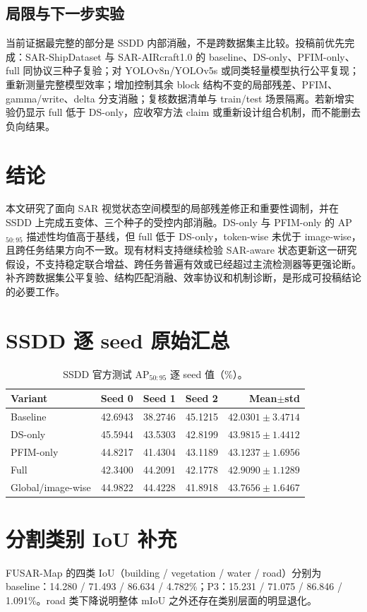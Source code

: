 \documentclass[UTF8,12pt,a4paper]{ctexart}
\begin{document}
\subsection{局限与下一步实验}
当前证据最完整的部分是 SSDD 内部消融，不是跨数据集主比较。投稿前优先完成：SAR-ShipDataset 与 SAR-AIRcraft1.0 的 baseline、DS-only、PFIM-only、full 同协议三种子复验；对 YOLOv8n/YOLOv5s 或同类轻量模型执行公平复现；重新测量完整模型效率；增加控制其余 block 结构不变的局部残差、PFIM、gamma/write、delta 分支消融；复核数据清单与 train/test 场景隔离。若新增实验仍显示 full 低于 DS-only，应收窄方法 claim 或重新设计组合机制，而不能删去负向结果。

\section{结论}
本文研究了面向 SAR 视觉状态空间模型的局部残差修正和重要性调制，并在 SSDD 上完成五变体、三个种子的受控内部消融。DS-only 与 PFIM-only 的 AP$_{50:95}$ 描述性均值高于基线，但 full 低于 DS-only，token-wise 未优于 image-wise，且跨任务结果方向不一致。现有材料支持继续检验 SAR-aware 状态更新这一研究假设，不支持稳定联合增益、跨任务普遍有效或已经超过主流检测器等更强论断。补齐跨数据集公平复验、结构匹配消融、效率协议和机制诊断，是形成可投稿结论的必要工作。

\appendix
\section{SSDD 逐 seed 原始汇总}
\begin{table}[H]\centering\small
\caption{SSDD 官方测试 AP$_{50:95}$ 逐 seed 值（\%）。}
\begin{tabular}{lrrrr}
\toprule
Variant & Seed 0 & Seed 1 & Seed 2 & Mean$\pm$std\\
\midrule
Baseline & 42.6943 & 38.2746 & 45.1215 & $42.0301\pm3.4714$\\
DS-only & 45.5944 & 43.5303 & 42.8199 & $43.9815\pm1.4412$\\
PFIM-only & 44.8217 & 41.4304 & 43.1189 & $43.1237\pm1.6956$\\
Full & 42.3400 & 44.2091 & 42.1778 & $42.9090\pm1.1289$\\
Global/image-wise & 44.9822 & 44.4228 & 41.8918 & $43.7656\pm1.6467$\\
\bottomrule
\end{tabular}
\end{table}

\section{分割类别 IoU 补充}
FUSAR-Map 的四类 IoU（building / vegetation / water / road）分别为 baseline：14.280 / 71.493 / 86.634 / 4.782\%；P3：15.231 / 71.075 / 86.846 / 1.091\%。road 类下降说明整体 mIoU 之外还存在类别层面的明显退化。
\end{document}
